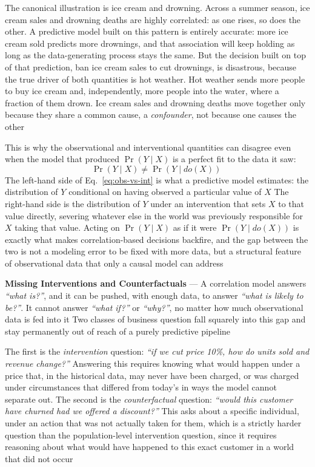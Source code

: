 The canonical illustration is ice cream and drowning. Across a summer season,
ice cream sales and drowning deaths are highly correlated: as one rises, so does
the other. A predictive model built on this pattern is entirely accurate: more
ice cream sold predicts more drownings, and that association will keep holding as
long as the data-generating process stays the same. But the decision built on
top of that prediction, ban ice cream sales to cut drownings, is disastrous, because
the true driver of both quantities is hot weather. Hot weather sends more people
to buy ice cream and, independently, more people into the water, where a fraction
of them drown. Ice cream sales and drowning deaths move together only because
they share a common cause, a \emph{confounder}, not because one causes the other

This is why the observational and interventional quantities can disagree even
when the model that produced $\Pr(Y \mid X)$ is a perfect fit to the data it saw:
\begin{equation}
  \label{eq:obs-vs-int}\Pr(Y \mid X) \neq \Pr(Y \mid do(X))\;
\end{equation}
The left-hand side of Eq.~\eqref{eq:obs-vs-int} is what a predictive model estimates:
the distribution of $Y$ conditional on having observed a particular value of $X$
The right-hand side is the distribution of $Y$ under an intervention that sets $X$
to that value directly, severing whatever else in the world was previously
responsible for $X$ taking that value. Acting on $\Pr(Y \mid X)$ as if it were $\Pr
(Y \mid do(X))$ is exactly what makes correlation-based decisions backfire, and
the gap between the two is not a modeling error to be fixed with more data, but a
structural feature of observational data that only a causal model can address

\textbf{Missing Interventions and Counterfactuals} --- A correlation model answers
\emph{``what is?''}, and it can be pushed, with enough data, to answer \emph{``what
is likely to be?''}. It cannot answer \emph{``what if?''} or \emph{``why?''}, no
matter how much observational data is fed into it Two classes of business
question fall squarely into this gap and stay permanently out of reach of a
purely predictive pipeline

The first is the \emph{intervention} question: \emph{``if we cut price 10\%, how
do units sold and revenue change?''} Answering this requires knowing what would
happen under a price that, in the historical data, may never have been charged, or
was charged under circumstances that differed from today's in ways the model cannot
separate out. The second is the \emph{counterfactual} question: \emph{``would
this customer have churned had we offered a discount?''} This asks about a specific
individual, under an action that was not actually taken for them, which is a strictly
harder question than the population-level intervention question, since it
requires reasoning about what would have happened to this exact customer in a
world that did not occur

